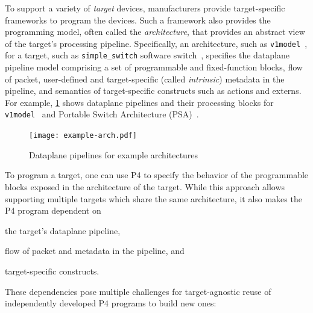 \documentclass[letterpaper,twocolumn,10pt]{article}
\begin{document}
 To support a variety of
\emph{target} devices, manufacturers provide target-specific
frameworks to program the devices. Such a framework also provides the
programming model, often called the \emph{architecture}, that provides
an abstract view of the target's processing pipeline. Specifically, an
architecture, such as \texttt{v1model}~\cite{v1model.p4}, for a
target, such as \texttt{simple\_switch} software
switch~\cite{simple_switch.md}, specifies the dataplane pipeline model
comprising a set of programmable and fixed-function blocks, flow of
packet, user-defined and target-specific (called \emph{intrinsic})
metadata in the pipeline, and semantics of target-specific constructs
such as actions and externs. For example, \cref{fig:arch-example}
shows dataplane pipelines and their processing blocks for
\texttt{v1model}~\cite{v1model.p4} and Portable Switch
Architecture (PSA)~\cite{psa}.
\begin{figure}[tb]
  \centering
  \texttt{[image: example-arch.pdf]}
  \caption{Dataplane pipelines for example architectures}
  \label{fig:arch-example}
\end{figure}

To program a target, one can use P4 to specify the behavior of the
programmable blocks exposed in the architecture of the target. While
this approach allows supporting multiple targets which share the same
architecture, it also makes the P4 program dependent on
\begin{enumerate*}[label=(\roman*)]
  \item the target's dataplane pipeline,
  \item flow of packet and metadata in the pipeline, and
  \item target-specific constructs.
\end{enumerate*}
These dependencies pose multiple challenges for target-agnostic reuse
of independently developed P4 programs to build new ones:


\end{document}

